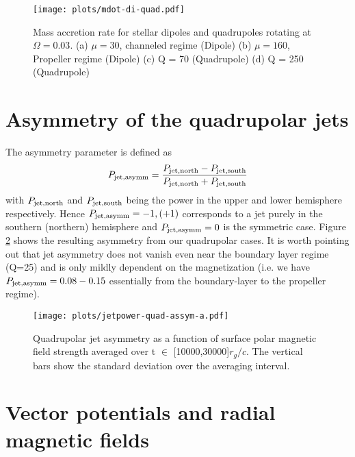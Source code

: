 \documentclass[fleqn,usenatbib]{mnras}
\begin{document}
\begin{figure}
\texttt{[image: plots/mdot-di-quad.pdf]}%
\caption{Mass accretion rate for stellar dipoles and quadrupoles rotating at $\Omega = 0.03$. (a) $\mu = 30$, channeled regime (Dipole)  (b) $\mu = 160$, Propeller regime (Dipole) (c) Q = 70 (Quadrupole) (d) Q = 250 (Quadrupole)}
\label{fig:mdot}
\end{figure}


\section{Asymmetry of the quadrupolar jets}\label{sec:asymm}
The asymmetry parameter is defined as 
\begin{align}
P_{\rm jet, asymm} = \frac{P_{\rm jet,north} - P_{\rm jet,south}}{P_{\rm jet,north} + P_{\rm jet,south}} 
\end{align}                         
with $P_{\rm jet,north}$ and $P_{\rm jet,south}$ being the power in the upper and lower hemisphere respectively.  Hence $P_{\rm jet, asymm}=-1 , (+1)$ corresponds to a jet purely in the southern (northern) hemisphere and $P_{\rm jet, asymm}=0$ is the symmetric case.  
Figure \ref{fig:jet-assym-quad} shows the resulting asymmetry from our quadrupolar cases.  It is worth pointing out that jet asymmetry does not vanish even near the boundary layer regime (Q=25) and is only mildly dependent on the magnetization (i.e. we have $P_{\rm jet, asymm}=0.08 - 0.15$ essentially from the boundary-layer to the propeller regime).  

\begin{figure}
\texttt{[image: plots/jetpower-quad-assym-a.pdf]}%
    \caption{Quadrupolar jet asymmetry as a function of surface polar magnetic field strength averaged over t $\in$ [10000,30000]$r_g/c$. The vertical bars show the standard deviation over the averaging interval.} %
    \label{fig:jet-assym-quad}
\end{figure}

\section{Vector potentials and radial magnetic fields}
\end{document}
